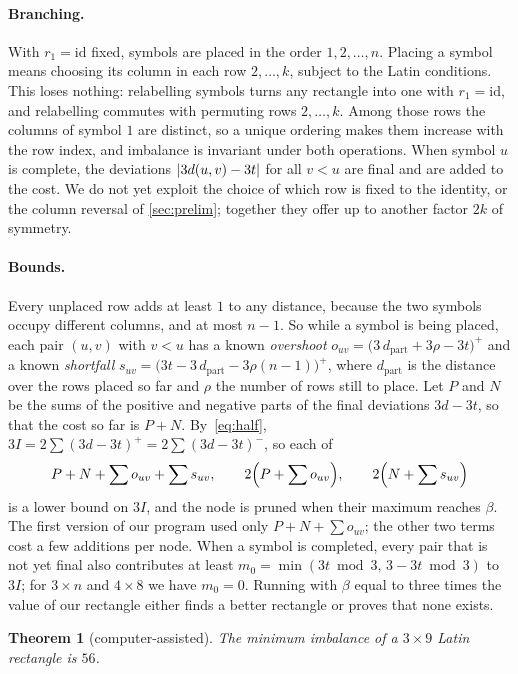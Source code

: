 \documentclass[11pt]{article}
\theoremstyle{plain}
\newtheorem{theorem}{Theorem}
\theoremstyle{definition}
\theoremstyle{remark}
\DeclarePairedDelimiter{\abs}{\lvert}{\rvert}
\begin{document}
\paragraph{Branching.} With $r_1=\mathrm{id}$ fixed, symbols are placed in the order $1,2,\dots,n$.
Placing a symbol means choosing its column in each row $2,\dots,k$, subject to the Latin
conditions. This loses nothing: relabelling symbols turns any rectangle into one with
$r_1=\mathrm{id}$, and relabelling commutes with permuting rows $2,\dots,k$. Among those rows the
columns of symbol $1$ are distinct, so a unique ordering makes them increase with the row index,
and imbalance is invariant under both operations. When symbol $u$ is complete, the deviations
$\abs{3d(u,v)-3t}$ for all $v<u$ are final and are added to the cost. We do not yet exploit the
choice of which row is fixed to the identity, or the column reversal of \cref{sec:prelim}; together
they offer up to another factor $2k$ of symmetry.

\paragraph{Bounds.} Every unplaced row adds at least $1$ to any distance, because the two symbols
occupy different columns, and at most $n-1$. So while a symbol is being placed, each pair
$(u,v)$ with $v<u$ has a known \emph{overshoot} $o_{uv}=\bigl(3\,d_{\mathrm{part}}+3\rho-3t\bigr)^+$
and a known \emph{shortfall} $s_{uv}=\bigl(3t-3\,d_{\mathrm{part}}-3\rho(n-1)\bigr)^+$, where
$d_{\mathrm{part}}$ is the distance over the rows placed so far and $\rho$ the number of rows still
to place. Let $P$ and $N$ be the sums of the positive and negative parts of the final deviations
$3d-3t$, so that the cost so far is $P+N$. By~\eqref{eq:half}, $3I=2\sum(3d-3t)^+=2\sum(3d-3t)^-$,
so each of
\[
  P+N+\sum o_{uv}+\sum s_{uv},\qquad 2\Bigl(P+\sum o_{uv}\Bigr),\qquad 2\Bigl(N+\sum s_{uv}\Bigr)
\]
is a lower bound on $3I$, and the node is pruned when their maximum reaches $\beta$. The first
version of our program used only $P+N+\sum o_{uv}$; the other two terms cost a few additions per
node. When a symbol is completed, every pair that is not yet final also contributes at
least $m_0=\min(3t\bmod 3,\,3-3t\bmod 3)$ to $3I$; for $3\times n$ and $4\times 8$ we have $m_0=0$.
Running with $\beta$ equal to three times the value of our rectangle either finds a better
rectangle or proves that none exists.

\begin{theorem}[computer-assisted]\label{thm:3x9}
The minimum imbalance of a $3\times 9$ Latin rectangle is $56$.
\end{theorem}
\end{document}
